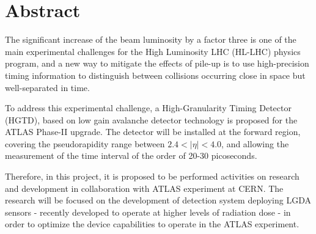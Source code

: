 \chapter*{Abstract}


The significant increase of the beam luminosity by a factor three \cite{HL_LHC,tdr} is one of the main experimental challenges for the High Luminosity LHC (HL-LHC) physics program, and a new way to mitigate the effects of pile-up is to use high-precision timing information to distinguish between collisions occurring close in space but well-separated in time.

To address this experimental challenge, a High-Granularity Timing Detector (HGTD), based on low gain avalanche detector technology is proposed for the ATLAS Phase-II upgrade. The detector will be installed at the forward region, covering the pseudorapidity range between $2.4< |\eta| <4.0$, and allowing the measurement of the time interval of the order of 20-30 picoseconds.


Therefore, in this project, it is proposed to be performed activities on research and development in collaboration with ATLAS experiment at CERN. The research will be focused on the development of detection system deploying LGDA sensors - recently developed to operate at higher levels of radiation dose \cite{JIN_LGAD,NIMA_LGAD,NIMA_LGAD_I,NIMA_LGAD_II,NIMA_LGAD_III} - in order to optimize the device capabilities to operate in the ATLAS experiment. %